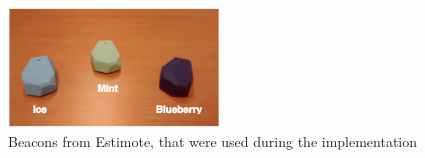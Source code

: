 \begin{figure}[!ht]
  \centering
    \includegraphics[width=0.5\textwidth, keepaspectratio]{images/beacons_photo}
    \caption[Estimote beacons]{Beacons from Estimote, that were used during the implementation}
    \label{fig:estimote}
\end{figure}

\vfill

